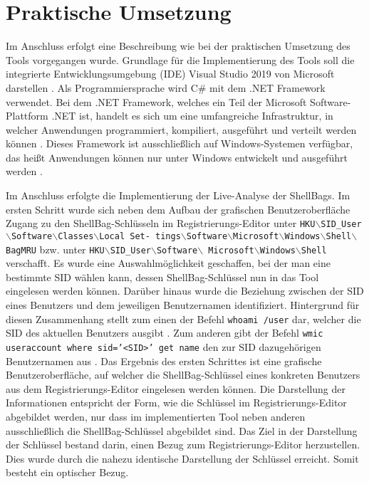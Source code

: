 \section{Praktische Umsetzung}
Im Anschluss erfolgt eine Beschreibung wie bei der praktischen Umsetzung des Tools vorgegangen wurde. \newline
Grundlage für die Implementierung des Tools soll die integrierte Entwicklungsumgebung (IDE) Visual Studio 2019 von Microsoft darstellen \cite{vs}. Als Programmiersprache wird C\# mit dem .NET Framework verwendet. Bei dem .NET Framework, welches ein Teil der Microsoft Software-Plattform .NET ist, handelt es sich um eine umfangreiche Infrastruktur, in welcher Anwendungen programmiert, kompiliert, ausgeführt und verteilt werden können \cite[S.68]{bayer2008visual}. Dieses Framework ist ausschließlich auf Windows-Systemen verfügbar, das heißt Anwendungen können nur unter Windows entwickelt und ausgeführt werden \cite{netfw}.

Im Anschluss erfolgte die Implementierung der Live-Analyse der ShellBags. Im ersten Schritt wurde sich neben dem Aufbau der grafischen Benutzeroberfläche Zugang zu den ShellBag-Schlüsseln im Registrierungs-Editor unter \texttt{HKU$\backslash$SID\_User$\backslash$Software$\backslash$Classes$\backslash$Local Set- \newline tings$\backslash$Software$\backslash$Microsoft$\backslash$Windows$\backslash$Shell$\backslash$BagMRU} bzw. unter \texttt{HKU$\backslash$SID\_User$\backslash$Software$\backslash$ \newline Microsoft$\backslash$Windows$\backslash$Shell} verschafft. Es wurde eine Auswahlmöglichkeit geschaffen, bei der man eine bestimmte SID wählen kann, dessen ShellBag-Schlüssel nun in das Tool eingelesen werden können. Darüber hinaus wurde die Beziehung zwischen der SID eines Benutzers und dem jeweiligen Benutzernamen identifiziert. Hintergrund für diesen Zusammenhang stellt zum einen der Befehl \glqq \texttt{whoami /user}\grqq{} dar, welcher die SID des aktuellen Benutzers ausgibt \cite{whoami}. Zum anderen gibt der Befehl \glqq \texttt{wmic useraccount where sid='<SID>' get name}\grqq{} den zur SID dazugehörigen Benutzernamen aus \cite{sid}. Das Ergebnis des ersten Schrittes ist eine grafische Benutzeroberfläche, auf welcher die ShellBag-Schlüssel eines konkreten Benutzers aus dem Registrierungs-Editor eingelesen werden können. Die Darstellung der Informationen entspricht der Form, wie die Schlüssel im Registrierungs-Editor abgebildet werden, nur dass im implementierten Tool neben anderen ausschließlich die ShellBag-Schlüssel abgebildet sind. Das Ziel in der Darstellung der Schlüssel bestand darin, einen Bezug zum Registrierungs-Editor herzustellen. Dies wurde durch die nahezu identische Darstellung der Schlüssel erreicht. Somit besteht ein optischer Bezug.


